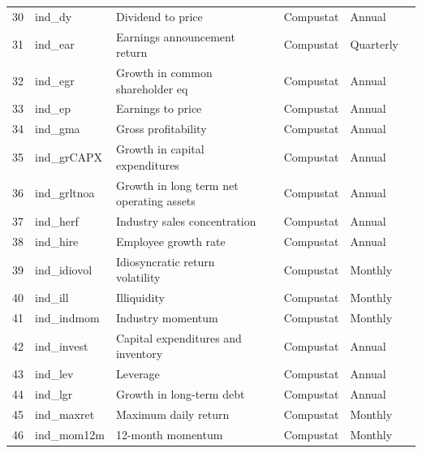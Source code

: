 \documentclass[11pt, a4paper, table]{article}
\begin{document}
\begin{landscape}
\begin{center}
\begin{longtable}{lllllll}
			30 & ind\_dy & Dividend to price & 
				\cite{litzenberger_effects_1982} & Compustat & Annual \\
			31 & ind\_ear & Earnings announcement return & 
				\cite{brandt_earnings_2008} & Compustat & Quarterly \\
			32 & ind\_egr & Growth in common shareholder eq & 
				\cite{richardson_accrual_2005} & Compustat & Annual \\
			33 & ind\_ep & Earnings to price & 
				\cite{basu_investment_1977} & Compustat & Annual \\
			34 & ind\_gma & Gross profitability & 
				\cite{novy-marx_other_2013} & Compustat & Annual \\
			35 & ind\_grCAPX\footnotemark[\value{footnote}] & Growth in capital expenditures & 
				\cite{anderson_empirical_2006} & Compustat & Annual \\
			36 & ind\_grltnoa\footnotemark[\value{footnote}] & Growth in long term net operating assets & 
				\cite{fairfield_accrued_2003} & Compustat & Annual \\
			37 & ind\_herf & Industry sales concentration & 
				\cite{hou_industry_2006} & Compustat & Annual \\
			38 & ind\_hire & Employee growth rate & 
				\cite{belo_labor_2014} & Compustat & Annual \\
			39 & ind\_idiovol & Idiosyncratic return volatility & 
				\cite{ali_arbitrage_2003} & Compustat & Monthly \\
			40 & ind\_ill & Illiquidity & 
				\cite{amihud_illiquidity_2002} & Compustat & Monthly \\
			41 & ind\_indmom & Industry momentum & 
				\cite{moskowitz_industries_1999} & Compustat & Monthly \\
			42 & ind\_invest\footnotemark[\value{footnote}] & Capital expenditures and inventory & 
				\cite{chen_better_2010} & Compustat & Annual \\
			43 & ind\_lev & Leverage & 
				\cite{bhandari_debt/equity_1988} & Compustat & Annual \\
			44 & ind\_lgr & Growth in long-term debt & 
				\cite{richardson_accrual_2005} & Compustat & Annual \\
			45 & ind\_maxret & Maximum daily return & 
				\cite{bali_maxing_2011} & Compustat & Monthly \\
			46 & ind\_mom12m & 12-month momentum & 
				\cite{jegadeesh_evidence_1990} & Compustat & Monthly \\

\end{longtable}
\end{center}
\end{landscape}
\end{document}
